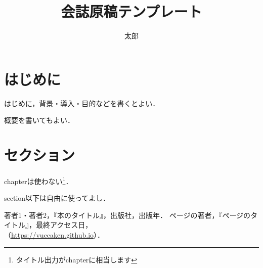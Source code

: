 \documentclass[uplatex,dvipdfmx]{vkaishi}
\begin{document}
\title{会誌原稿テンプレート}%
\author[テンプレ]{太郎}%

\maketitle %



\section*{はじめに}
はじめに，背景・導入・目的などを書くとよい．\par
概要を書いてもよい．


\section{セクション}
chapterは使わない\footnote{タイトル出力がchapterに相当します}．\par
section以下は自由に使ってよし．


\begin{thebibliography}{99}
   著者1・著者2，『本のタイトル』，出版社，出版年．
   ページの著者，『ページのタイトル』，最終アクセス日，\\（\url{https://vuccaken.github.io}）．
\end{thebibliography}
\end{document}
